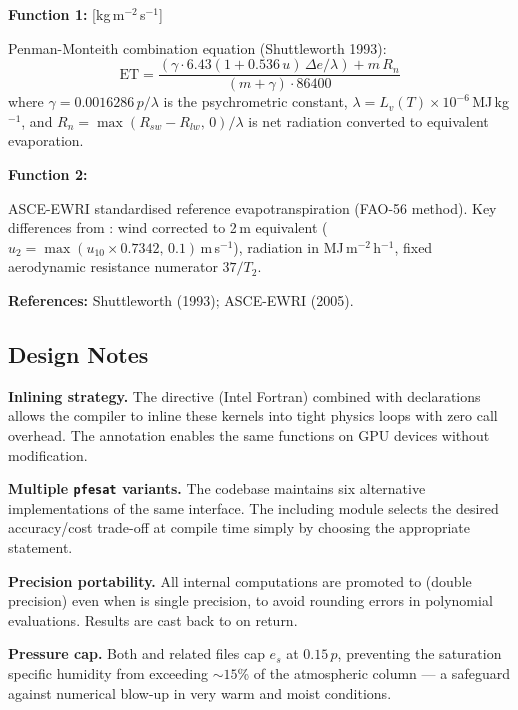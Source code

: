 \textbf{Function 1:} 
[kg\,m$^{-2}$\,s$^{-1}$]

Penman-Monteith combination equation (Shuttleworth 1993):
\[
  \text{ET} =
  \frac{(\gamma\cdot6.43(1+0.536\,u)\,\Delta e/\lambda) + m\,R_n}
       {(m + \gamma)\cdot86400}
\]
where $\gamma = 0.0016286\,p/\lambda$ is the psychrometric constant,
$\lambda = L_v(T)\times10^{-6}$\,MJ\,kg$^{-1}$, and
$R_n = \max(R_{sw}-R_{lw},\,0)/\lambda$ is net radiation converted to
equivalent evaporation.

\textbf{Function 2:} 

ASCE-EWRI standardised reference evapotranspiration (FAO-56 method).
Key differences from : wind corrected to 2\,m equivalent
($u_2 = \max(u_{10}\times0.7342,\,0.1)$\,m\,s$^{-1}$), radiation in
MJ\,m$^{-2}$\,h$^{-1}$, fixed aerodynamic resistance numerator $37/T_2$.

\textbf{References:} Shuttleworth (1993); ASCE-EWRI (2005).

\subsection{Design Notes}

\textbf{Inlining strategy.} The  directive
(Intel Fortran) combined with  declarations allows the
compiler to inline these kernels into tight physics loops with zero call
overhead. The  annotation enables the same functions
on GPU devices without modification.

\textbf{Multiple \texttt{pfesat} variants.} The codebase maintains six
alternative implementations of the same  interface. The including
module selects the desired accuracy/cost trade-off at compile time simply by
choosing the appropriate  statement.

\textbf{Precision portability.} All internal computations are promoted to
 (double precision) even when  is single precision, to
avoid rounding errors in polynomial evaluations. Results are cast back to
 on return.

\textbf{Pressure cap.} Both  and related files cap $e_s$ at
$0.15\,p$, preventing the saturation specific humidity from exceeding
$\sim15$\% of the atmospheric column --- a safeguard against numerical
blow-up in very warm and moist conditions.

